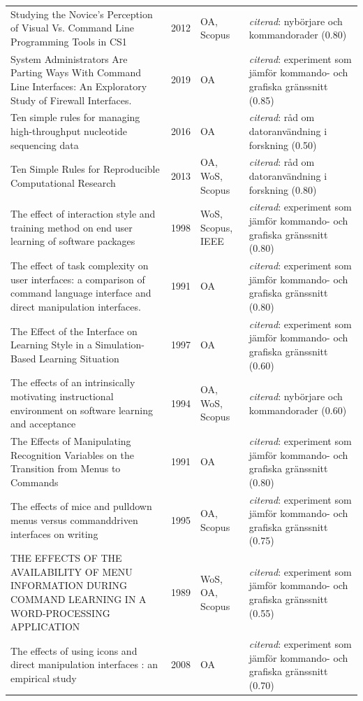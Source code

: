 \begin{longtable}{@{}%
  >{\raggedright\arraybackslash}p{}c%
  >{\raggedright\arraybackslash}p{}%
  >{\raggedright\arraybackslash}p{}@{}}
Studying the Novice's Perception of Visual Vs. Command Line Programming Tools in CS1 & 2012 & OA, Scopus & \emph{citerad}: nybörjare och kommandorader (0.80) \\
System Administrators Are Parting Ways With Command Line Interfaces: An Exploratory Study of Firewall Interfaces. & 2019 & OA & \emph{citerad}: experiment som jämför kommando- och grafiska gränssnitt (0.85) \\
Ten simple rules for managing high-throughput nucleotide sequencing data & 2016 & OA & \emph{citerad}: råd om datoranvändning i forskning (0.50) \\
Ten Simple Rules for Reproducible Computational Research & 2013 & OA, WoS, Scopus & \emph{citerad}: råd om datoranvändning i forskning (0.80) \\
The effect of interaction style and training method on end user learning of software packages & 1998 & WoS, Scopus, IEEE & \emph{citerad}: experiment som jämför kommando- och grafiska gränssnitt (0.80) \\
The effect of task complexity on user interfaces: a comparison of command language interface and direct manipulation interfaces. & 1991 & OA & \emph{citerad}: experiment som jämför kommando- och grafiska gränssnitt (0.80) \\
The Effect of the Interface on Learning Style in a Simulation-Based Learning Situation & 1997 & OA & \emph{citerad}: experiment som jämför kommando- och grafiska gränssnitt (0.60) \\
The effects of an intrinsically motivating instructional environment on software learning and acceptance & 1994 & OA, WoS, Scopus & \emph{citerad}: nybörjare och kommandorader (0.60) \\
The Effects of Manipulating Recognition Variables on the Transition from Menus to Commands & 1991 & OA & \emph{citerad}: experiment som jämför kommando- och grafiska gränssnitt (0.80) \\
The effects of mice and pulldown menus versus commanddriven interfaces on writing & 1995 & OA, Scopus & \emph{citerad}: experiment som jämför kommando- och grafiska gränssnitt (0.75) \\
THE EFFECTS OF THE AVAILABILITY OF MENU INFORMATION DURING COMMAND LEARNING IN A WORD-PROCESSING APPLICATION & 1989 & WoS, OA, Scopus & \emph{citerad}: experiment som jämför kommando- och grafiska gränssnitt (0.55) \\
The effects of using icons and direct manipulation interfaces : an empirical study & 2008 & OA & \emph{citerad}: experiment som jämför kommando- och grafiska gränssnitt (0.70) \\

\end{longtable}
